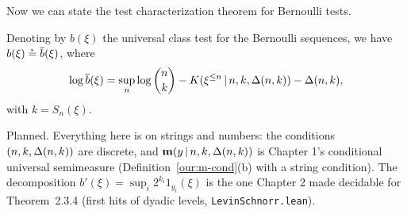 Now we can state the test characterization theorem for Bernoulli tests.

 \begin{theorem}
  \label{thm:g4.6.3}
Denoting by \( b(\xi) \) the universal class test for the Bernoulli sequences, we
have \( b(\xi) \stackrel{{}_*}{=} \overline{b}(\xi) \),
where
  \begin{align*}
  \log \overline{b}(\xi) = \sup_{n}\log\binom{n}{k}-K(\xi^{\le n}\,\vert\, n,k,\Delta(n,k))-\Delta(n,k),
 \end{align*}
with \( k=S_{n}(\xi) \).
 \end{theorem}

\begin{formalization}
Planned. Everything here is on strings and numbers: the conditions $(n,k,\Delta(n,k))$ are discrete,
and $\mathbf{m}(y \,\vert\, n,k,\Delta(n,k))$ is Chapter 1's conditional universal semimeasure
(Definition~\ref{our:m-cond}(b) with a string condition). The decomposition
$b'(\xi) = \sup_{i}2^{k_{i}}1_{y_{i}}(\xi)$ is the one Chapter 2 made decidable for
Theorem~2.3.4 (first hits of dyadic levels, \texttt{LevinSchnorr.lean}).
\end{formalization}

